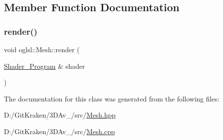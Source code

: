 \subsection{Member Function Documentation}
\mbox{\label{classoglsl_1_1_mesh_a358dea364d978e49c8df22fa9ad62c21}} 
\subsubsection{\texorpdfstring{render()}{render()}}
{\footnotesize\ttfamily void oglsl\+::\+Mesh\+::render (\begin{DoxyParamCaption}\item[{\mbox{\hyperlink{classoglsl_1_1_shader___program}{Shader\+\_\+\+Program}} \&}]{shader }\end{DoxyParamCaption})}



The documentation for this class was generated from the following files\+:\begin{DoxyCompactItemize}
\item 
D\+:/\+Git\+Kraken/3\+D\+Av\+\_/src/\mbox{\hyperlink{_mesh_8hpp}{Mesh.\+hpp}}\item 
D\+:/\+Git\+Kraken/3\+D\+Av\+\_/src/\mbox{\hyperlink{_mesh_8cpp}{Mesh.\+cpp}}\end{DoxyCompactItemize}
